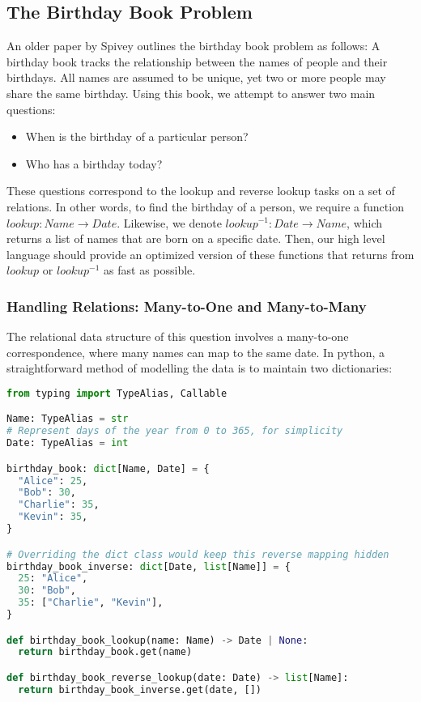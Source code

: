 \documentclass{article}
\begin{document}
\subsection{The Birthday Book Problem}

An older paper by Spivey \cite{spivey1989birthday} outlines the birthday book problem as follows: A birthday book tracks the relationship between the names of people and their birthdays. All names are assumed to be unique, yet two or more people may share the same birthday. Using this book, we attempt to answer two main questions:
\begin{itemize}
  \item When is the birthday of a particular person?
  \item Who has a birthday today?
\end{itemize}
These questions correspond to the lookup and reverse lookup tasks on a set of relations. In other words, to find the birthday of a person, we require a function $lookup: Name \rightarrow Date$. Likewise, we denote $lookup^{-1}: Date \rightarrow {{Name}}$, which returns a list of names that are born on a specific date. Then, our high level language should provide an optimized version of these functions that returns from $lookup$ or $lookup^{-1}$ as fast as possible.

\subsubsection{Handling Relations: Many-to-One and Many-to-Many}

The relational data structure of this question involves a many-to-one correspondence, where many names can map to the same date. In python, a straightforward method of modelling the data is to maintain two dictionaries:

\begin{lstlisting}[language=python]
from typing import TypeAlias, Callable

Name: TypeAlias = str
# Represent days of the year from 0 to 365, for simplicity
Date: TypeAlias = int

birthday_book: dict[Name, Date] = {
  "Alice": 25,
  "Bob": 30,
  "Charlie": 35,
  "Kevin": 35,
}

# Overriding the dict class would keep this reverse mapping hidden
birthday_book_inverse: dict[Date, list[Name]] = {
  25: "Alice",
  30: "Bob",
  35: ["Charlie", "Kevin"],
}

def birthday_book_lookup(name: Name) -> Date | None:
  return birthday_book.get(name)

def birthday_book_reverse_lookup(date: Date) -> list[Name]:
  return birthday_book_inverse.get(date, [])
\end{lstlisting}
\end{document}
